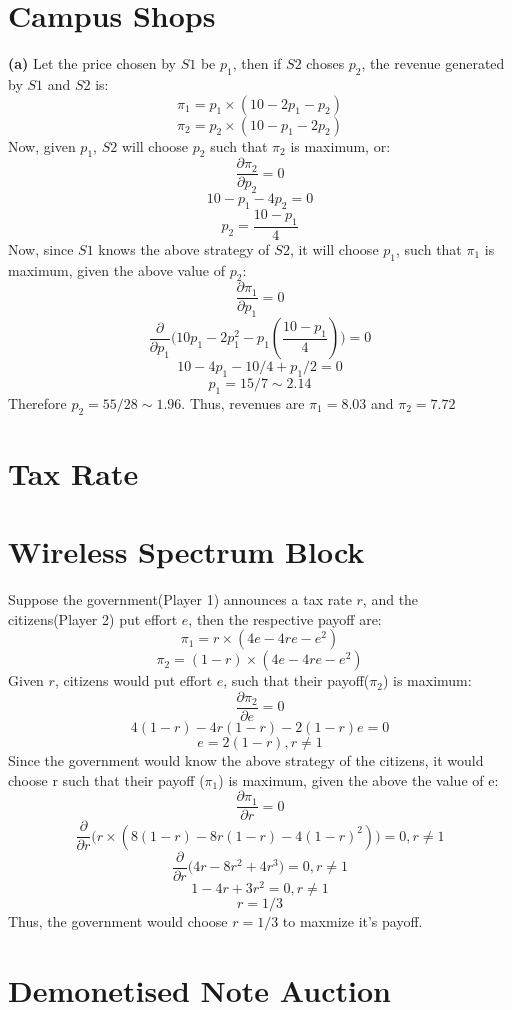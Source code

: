 \documentclass{article}
\begin{document}
\section{Campus Shops}
\textbf{(a)} Let the price chosen by $S1$ be $p_1$, then if $S2$ choses $p_2$, the revenue generated by $S1$ and $S2$ is: 
$$\pi_{1} = p_1 \times (10-2p_1-p_2)$$
$$\pi_{2} = p_2 \times (10-p_1-2p_2)$$
Now, given $p_1$, $S2$ will choose $p_2$ such that $\pi_2$ is maximum, or:
$$\frac{\partial \pi_2}{\partial p_2}= 0$$
$$ 10 - p_1 -4p_2  = 0$$
$$p_2 = \frac{10-p_1}{4}$$
Now, since $S1$ knows the above strategy of $S2$, it will choose $p_1$, such that $\pi_1$ is maximum, given the above value of $p_2$:
$$\frac{\partial \pi_1}{\partial p_1}= 0$$
$$\frac{\partial}{\partial p_1}\Big(10p_1 - 2p_1^2 -p_1(\frac{10-p_1}{4})\Big)= 0$$
$$10 - 4p_1 - 10/4 + p_1/2 = 0$$
$$p_1 = 15/7 \sim 2.14$$
Therefore $p_2 = 55/28 \sim 1.96$. Thus, revenues are $\pi_1 = 8.03$ and $\pi_2 = 7.72$
\section{Tax Rate}
\section{Wireless Spectrum Block}
Suppose the government(Player 1) announces a tax rate $r$, and the citizens(Player 2) put effort $e$, then the respective payoff are:
$$ \pi_1 = r \times (4e - 4re - e^2)$$
$$ \pi_2 = (1-r) \times (4e - 4re - e^2)$$
Given $r$, citizens would put effort $e$, such that their payoff($\pi_2$) is maximum:
$$\frac{\partial \pi_2}{\partial e}= 0$$
$$ 4(1-r)- 4r(1-r) - 2(1-r)e = 0$$
$$e = 2(1- r), r \neq 1$$
Since the government would know the above strategy of the citizens, it would choose r such that their payoff ($\pi_1$) is maximum, given the above the value of e:
$$\frac{\partial \pi_1}{\partial r}= 0$$
$$\frac{\partial}{\partial r}\Big(r \times (8(1-r) - 8r(1-r) - 4(1-r)^2)\Big)= 0,r \neq 1$$
$$\frac{\partial}{\partial r}\Big(4r - 8r^2+4r^3\Big)= 0,r \neq 1$$
$$1 - 4r + 3r^2 = 0,r \neq 1$$
$$r = 1/3$$
Thus, the government would choose $r=1/3$ to maxmize it's payoff.

\section{Demonetised Note Auction}
\end{document}
